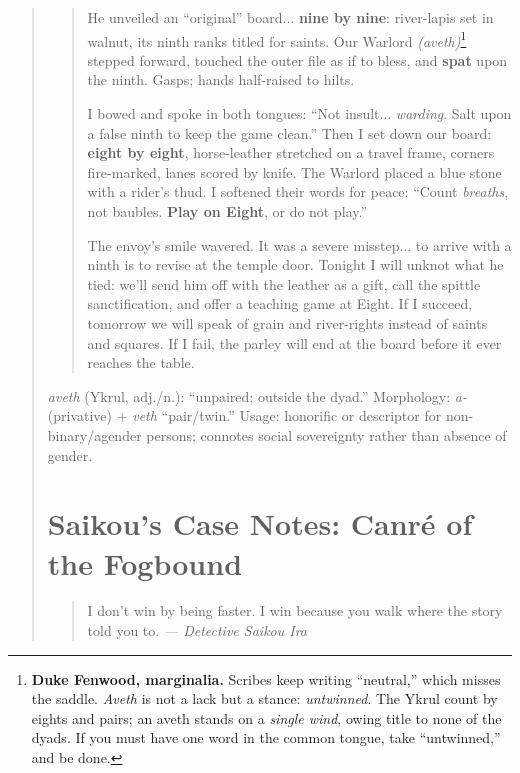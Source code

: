 \documentclass[11pt]{article}
\begin{document}
\begin{quote}
\begin{quote}
He unveiled an “original” board... \textbf{nine by nine}: river-lapis set in walnut, its ninth ranks titled for saints. 
Our Warlord \textit{(aveth)}\footnote{\textbf{Duke Fenwood, marginalia.} 
Scribes keep writing “neutral,” which misses the saddle. \textit{Aveth} is not a lack but a stance: \emph{untwinned}. 
The Ykrul count by eights and pairs; an aveth stands on a \emph{single wind}, owing title to none of the dyads. If you must have one word in the common tongue, take “untwinned,” and be done.} stepped forward, touched the outer file as if to bless, and \textbf{spat} upon the ninth. Gasps; hands half-raised to hilts.

I bowed and spoke in both tongues: “Not insult... \emph{warding}. Salt upon a false ninth to keep the game clean.” 
Then I set down our board: \textbf{eight by eight}, horse-leather stretched on a travel frame, corners fire-marked, lanes scored by knife. 
The Warlord placed a blue stone with a rider’s thud. I softened their words for peace: “Count \emph{breaths}, not baubles. \textbf{Play on Eight}, or do not play.”

The envoy’s smile wavered. It was a severe misstep... to arrive with a ninth is to revise at the temple door. 
Tonight I will unknot what he tied: we’ll send him off with the leather as a gift, call the spittle sanctification, and offer a teaching game at Eight. 
If I succeed, tomorrow we will speak of grain and river-rights instead of saints and squares. 
If I fail, the parley will end at the board before it ever reaches the table.
\end{quote}

\medskip
\noindent\textit{aveth} (Ykrul, adj./n.): “unpaired; outside the dyad.” 
Morphology: \textit{a-} (privative) + \textit{veth} “pair/twin.” 
Usage: honorific or descriptor for non-binary/agender persons; connotes social sovereignty rather than absence of gender.

\section{Saikou’s Case Notes: Canré of the Fogbound}
\label{sec:saikou-manual}

\begin{quote}\small
I don’t win by being faster. I win because you walk where the story told you to. \textit{— Detective Saikou Ira}
\end{quote}


\end{quote}
\end{document}
